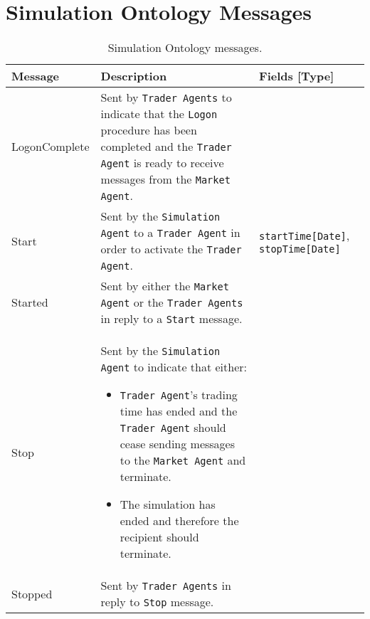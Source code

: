 \chapter{Simulation Ontology Messages}
\label{Appendix/Simulation-Ontology}

\begin{table}[ht]
\begin{center}
\begin{tabular}{l p{3in} p{1.5in}}

\multicolumn{1}{l}{\textbf{Message}}  	    &
\multicolumn{1}{l}{\textbf{Description}}    & 
\multicolumn{1}{l}{\textbf{Fields [Type]}}	\\              
\toprule

LogonComplete & Sent by \texttt{Trader Agents} to indicate that the \texttt{Logon} procedure has been completed and the \texttt{Trader Agent} is ready to receive messages from the \texttt{Market Agent}. &   \\

Start & Sent by the \texttt{Simulation Agent} to a \texttt{Trader Agent} in order to activate the \texttt{Trader Agent}. 
& \texttt{startTime[Date]}, \texttt{stopTime[Date]} \\

Started & Sent by either the \texttt{Market Agent} or the \texttt{Trader Agents} in reply to a \texttt{Start} message. & \\

Stop	& Sent by the \texttt{Simulation Agent} to indicate that either:
\begin{itemize}
\item \texttt{Trader Agent}'s trading time has ended and the \texttt{Trader Agent} should cease sending messages to the \texttt{Market Agent} and terminate.
\item The simulation has ended and therefore the recipient should terminate.
\end{itemize}	& \\

Stopped	& Sent by \texttt{Trader Agents} in reply to \texttt{Stop} message. & \\

\end{tabular}
\end{center}
\caption{Simulation Ontology messages.}        
\end{table}